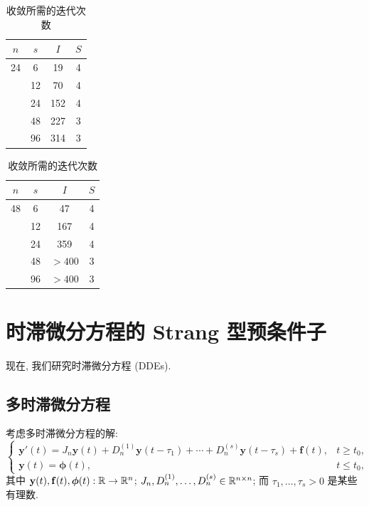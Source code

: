 \begin{table}[htbp]
  \centering
  \caption{收敛所需的迭代次数}
  \label{tab:9-1}
  \begin{tabular}{cccc}
    \toprule
    $n$ & $s$ & $I$ & $S$\\ \midrule
    24 & 6  & 19  & 4\\
       & 12 & 70  & 4\\
       & 24 & 152 & 4\\
       & 48 & 227 & 3\\
       & 96 & 314 & 3\\ \bottomrule
  \end{tabular}
  \hspace{2em}
  \begin{tabular}{cccc}
    \toprule
    $n$ & $s$ & $I$ & $S$\\ \midrule
    48 & 6  & 47   & 4\\
       & 12 & 167  & 4\\
       & 24 & 359  & 4\\
       & 48 & $>\!400$ & 3\\
       & 96 & $>\!400$ & 3\\ \bottomrule
  \end{tabular}
\end{table}

\section{时滞微分方程的 Strang 型预条件子}
\label{sec:9-4}

现在, 我们研究时滞微分方程 (DDEs).

\subsection{多时滞微分方程}
\label{sec:9-4-1}

考虑多时滞微分方程的解:
\begin{equation}
  \left\{
  \begin{array}{ll}
    \mathbf{y}'(t)=J_n\mathbf{y}(t)+D_n^{(1)}\mathbf{y}(t-\tau_1)
      +\cdots+D_n^{(s)}\mathbf{y}(t-\tau_s)+\mathbf{f}(t), & t\geqslant t_0,\\
    \mathbf{y}(t)=\boldsymbol{\phi}(t), & t\leqslant t_0,
  \end{array}
  \right.
  \label{eq:9-13}
\end{equation}
其中 $\mathbf{y}(t),\mathbf{f}(t),\boldsymbol{\phi}(t):\mathbb{R}\to\mathbb{R}^n$; $J_n,D_n^{(1)},\ldots,D_n^{(s)}\in\mathbb{R}^{n\times n}$; 而 $\tau_1,\ldots,\tau_s>0$ 是某些有理数.

